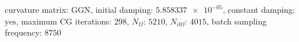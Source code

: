 curvature matrix: $\text{GGN}$, initial damping: $\num[scientific-notation=true]{5.858337e-05}$, constant damping: $\text{yes}$, maximum CG iterations: $\num[scientific-notation=false]{298}$, $N_{\Omega}$: $\num[scientific-notation=false]{5210}$, $N_{\partial\Omega}$: $\num[scientific-notation=false]{4015}$, batch sampling frequency: $\num[scientific-notation=false]{8750}$
